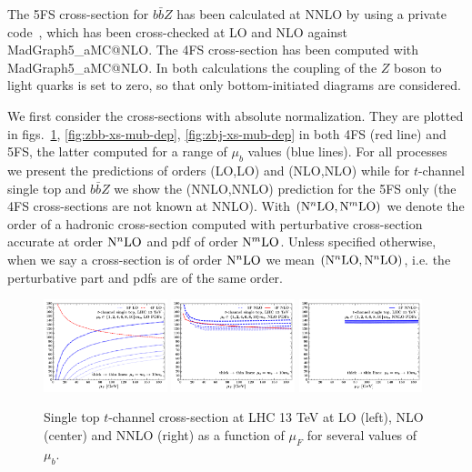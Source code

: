 \documentclass[letter,11pt]{article}
\def\mub{\mu_b}
\begin{document}
The 5FS cross-section for $b\bar{b}Z$ has been calculated at NNLO by using a private code~\cite{Maltoni:2005wd}, which has been cross-checked at LO and NLO against {\sc\small MadGraph5\_aMC@NLO}. The 4FS cross-section has been computed with {\sc\small MadGraph5\_aMC@NLO}. In both calculations the coupling of the $Z$ boson to light quarks is set to zero, so that only bottom-initiated diagrams are considered.

We first consider the cross-sections with absolute normalization. They are plotted in figs.~\ref{fig:tj-disc}, \ref{fig:zbb-xs-mub-dep}, \ref{fig:zbj-xs-mub-dep} in both 4FS (red line) and 5FS, the latter computed for a range of $\mub$ values (blue lines). For all processes we present the predictions of orders (LO,LO) and (NLO,NLO) while for $t$-channel single top and $b\bar{b}Z$ we show the (NNLO,NNLO) prediction for the 5FS only (the 4FS cross-sections are not known at NNLO). With $({\rm N}^n{\rm LO},{\rm N}^m{\rm LO})$ we denote the order of a hadronic cross-section computed with perturbative cross-section accurate at order ${\rm N}^n{\rm LO}$ and pdf of order ${\rm N}^m{\rm LO}$. Unless specified otherwise, when we say a cross-section is of order ${\rm N}^n{\rm LO}$ we mean $({\rm N}^n{\rm LO},{\rm N}^n{\rm LO})$, i.e. the perturbative part and pdfs are of the same order.
%
\begin{figure}[t]
\centering
\includegraphics[trim=0.4cm 0.0cm 0.2cm 0.4cm,clip,width=0.32\textwidth]{./tj_xs_mubdep_lo_lopdfs.pdf}
\includegraphics[trim=0.4cm 0.0cm 0.2cm 0.4cm,clip,width=0.32\textwidth]{./tj_xs_mubdep_nlo_nlopdfs.pdf}
\includegraphics[trim=0.4cm 0.0cm 0.2cm 0.4cm,clip,width=0.32\textwidth]{./tj_xs_mubdep_nnlo_nnlopdfs.pdf}
\caption{Single top $t$-channel cross-section at LHC 13 TeV at LO (left), NLO (center) and NNLO (right) as a function of $\mu_F$ for several values of $\mub$.}
\label{fig:tj-disc}
\end{figure}
\end{document}

